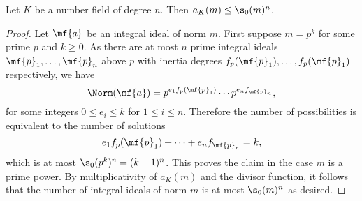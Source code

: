     \begin{proposition}\label{equ:ideals_of_fixed_norm_bound}
      Let $K$ be a number field of degree $n$. Then $a_{K}(m) \le \s_{0}(m)^{n}$.
    \end{proposition}
    \begin{proof}
      Let $\mf{a}$ be an integral ideal of norm $m$. First suppose $m = p^{k}$ for some prime $p$ and $k \ge 0$. As there are at most $n$ prime integral ideals $\mf{p}_{1},\ldots,\mf{p}_{n}$ above $p$ with inertia degrees $f_{p}(\mf{p}_{1}),\ldots,f_{p}(\mf{p}_{1})$ respectively, we have
      \[
        \Norm(\mf{a}) = p^{e_{1}f_{p}(\mf{p}_{1})} \cdots p^{e_{n}f_{\mf{p}_{n}}},
      \]
      for some integers $0 \le e_{i} \le k$ for $1 \le i \le n$. Therefore the number of possibilities is equivalent to the number of solutions
      \[
        e_{1}f_{p}(\mf{p}_{1})+\cdots+e_{n}f_{\mf{p}_{n}} = k,
      \]
      which is at most $\s_{0}(p^{k})^{n} = (k+1)^{n}$. This proves the claim in the case $m$ is a prime power. By multiplicativity of $a_{K}(m)$ and the divisor function, it follows that the number of integral ideals of norm $m$ is at most $\s_{0}(m)^{n}$ as desired.
    \end{proof}
